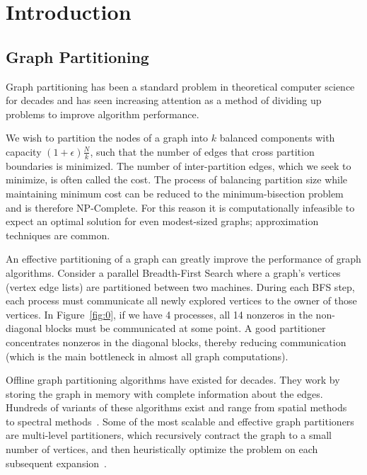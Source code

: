 \section{Introduction}
\subsection{Graph Partitioning}
Graph partitioning has been a standard problem in theoretical computer science for decades and has seen increasing attention as a method of dividing up problems to improve algorithm performance.

We wish to partition the nodes of a graph into $k$ balanced components with capacity $(1+\epsilon)\frac{N}{k}$, such that the number of edges that cross partition boundaries is minimized.
The number of inter-partition edges, which we seek to minimize, is often called the cost.
The process of balancing partition size while maintaining minimum cost can be reduced to the minimum-bisection problem~\cite{Garey:1979:CIG:578533} and is therefore NP-Complete.
For this reason it is computationally infeasible to expect an optimal solution for even modest-sized graphs; approximation techniques are common.

An effective partitioning of a graph can greatly improve the performance of graph algorithms.
Consider a parallel Breadth-First Search where a graph's vertices (vertex edge lists) are partitioned between two machines.
During each BFS step, each process must communicate all newly explored vertices to the owner of those vertices.
In Figure~\ref{fig:0}, if we have 4 processes, all 14 nonzeros in the non-diagonal blocks must be communicated at some point.
A good partitioner concentrates nonzeros in the diagonal blocks, thereby reducing communication (which is the main bottleneck in almost all graph computations). 

Offline graph partitioning algorithms have existed for decades.
They work by storing the graph in memory with complete information about the edges.
Hundreds of variants of these algorithms exist and range from spatial methods~\cite{Gilbert95geometricmesh} to spectral methods~\cite{arora2009expander}.
Some of the most scalable and effective graph partitioners are multi-level partitioners, which recursively contract the graph to a small number of vertices, and then heuristically optimize the problem on each subsequent expansion~\cite{karypis1998multilevel}. 


